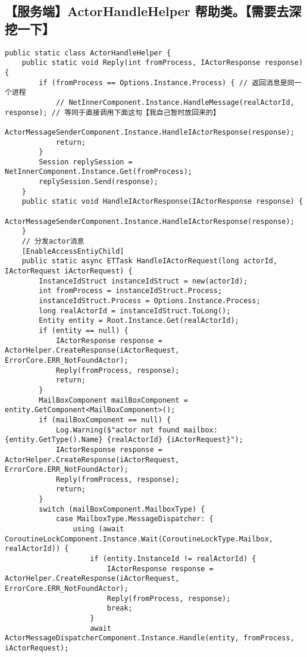 \documentclass[9pt, b5paper]{article}
\begin{document}
\subsection{【服务端】ActorHandleHelper 帮助类。【需要去深挖一下】}
\label{sec-1-16}
\begin{verbatim}
public static class ActorHandleHelper {
    public static void Reply(int fromProcess, IActorResponse response) {
        if (fromProcess == Options.Instance.Process) { // 返回消息是同一个进程
            // NetInnerComponent.Instance.HandleMessage(realActorId, response); // 等同于直接调用下面这句【我自己暂时放回来的】
            ActorMessageSenderComponent.Instance.HandleIActorResponse(response);
            return;
        }
        Session replySession = NetInnerComponent.Instance.Get(fromProcess);
        replySession.Send(response);
    }
    public static void HandleIActorResponse(IActorResponse response) {
        ActorMessageSenderComponent.Instance.HandleIActorResponse(response);
    }
    // 分发actor消息
    [EnableAccessEntiyChild]
    public static async ETTask HandleIActorRequest(long actorId, IActorRequest iActorRequest) {
        InstanceIdStruct instanceIdStruct = new(actorId);
        int fromProcess = instanceIdStruct.Process;
        instanceIdStruct.Process = Options.Instance.Process;
        long realActorId = instanceIdStruct.ToLong();
        Entity entity = Root.Instance.Get(realActorId);
        if (entity == null) {
            IActorResponse response = ActorHelper.CreateResponse(iActorRequest, ErrorCore.ERR_NotFoundActor);
            Reply(fromProcess, response);
            return;
        }
        MailBoxComponent mailBoxComponent = entity.GetComponent<MailBoxComponent>();
        if (mailBoxComponent == null) {
            Log.Warning($"actor not found mailbox: {entity.GetType().Name} {realActorId} {iActorRequest}");
            IActorResponse response = ActorHelper.CreateResponse(iActorRequest, ErrorCore.ERR_NotFoundActor);
            Reply(fromProcess, response);
            return;
        }
        switch (mailBoxComponent.MailboxType) {
            case MailboxType.MessageDispatcher: {
                using (await CoroutineLockComponent.Instance.Wait(CoroutineLockType.Mailbox, realActorId)) {
                    if (entity.InstanceId != realActorId) {
                        IActorResponse response = ActorHelper.CreateResponse(iActorRequest, ErrorCore.ERR_NotFoundActor);
                        Reply(fromProcess, response);
                        break;
                    }
                    await ActorMessageDispatcherComponent.Instance.Handle(entity, fromProcess, iActorRequest);

\end{verbatim}
\end{document}
